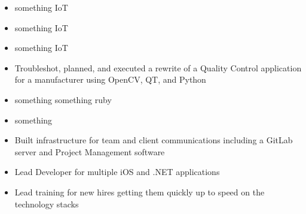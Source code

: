 \documentclass[letterpaper]{article}        %
\begin{document}



  
  \begin{itemize}
  
  \item something IoT
  
  \item something IoT
  
  \item something IoT
  
  \end{itemize}
  
  
  
  \begin{itemize}
  
  \item Troubleshot, planned, and executed a rewrite of a Quality Control application for a manufacturer using OpenCV, QT, and Python
  
  \item something something ruby
  
  \item something
  
  \end{itemize}
  
  
  
  \begin{itemize}
  
  \item Built infrastructure for team and client communications including a GitLab server and Project Management software
  
  \item Lead Developer for multiple iOS and .NET applications
  
  \item Lead training for new hires getting them quickly up to speed on the technology stacks
  
  \end{itemize}
  
  
  
\end{document}
